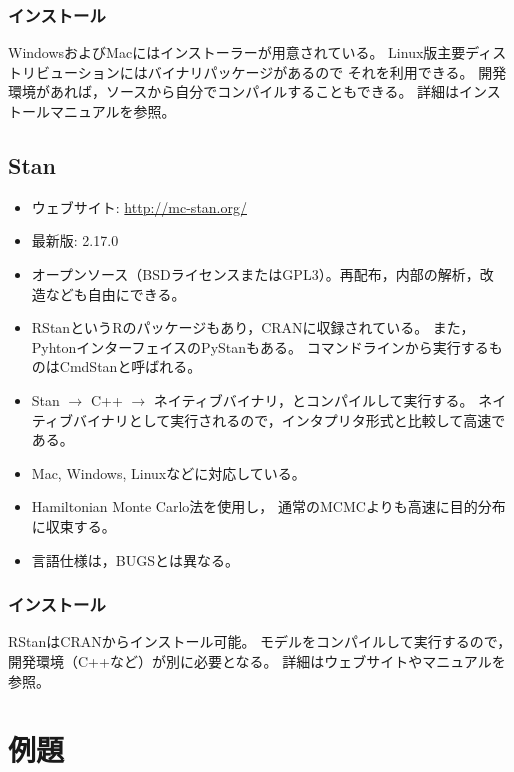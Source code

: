 \documentclass[11pt,uplatex]{jsarticle}
\begin{document}
\subsubsection*{インストール}
WindowsおよびMacにはインストーラーが用意されている。
Linux版主要ディストリビューションにはバイナリパッケージがあるので
それを利用できる。
開発環境があれば，ソースから自分でコンパイルすることもできる。
詳細はインストールマニュアルを参照。

\subsection{Stan}
\label{Stan}
\begin{itemize}

\item ウェブサイト:
  \url{http://mc-stan.org/}

\item 最新版: 2.17.0
\item オープンソース（BSDライセンスまたはGPL3）。再配布，内部の解析，改
  造なども自由にできる。
\item \textsf{RStan}という\textsf{R}のパッケージもあり，CRANに収録されている。
また，Pyhtonインターフェイスの\textsf{PyStan}もある。
コマンドラインから実行するものは\textsf{CmdStan}と呼ばれる。
\item Stan $\rightarrow$ C++ $\rightarrow$ ネイティブバイナリ，とコンパイルして実行する。
ネイティブバイナリとして実行されるので，インタプリタ形式と比較して高速である。
\item Mac, Windows, Linuxなどに対応している。
\item Hamiltonian Monte Carlo法\cite{PRML, BDA3, Toyoda2015}を使用し，
通常のMCMCよりも高速に目的分布に収束する。
\item 言語仕様は，BUGSとは異なる。
\end{itemize}

\subsubsection*{インストール}
RStanはCRANからインストール可能。
モデルをコンパイルして実行するので，開発環境（C++など）が別に必要となる。
詳細はウェブサイトやマニュアルを参照。



\section{例題}
\end{document}
